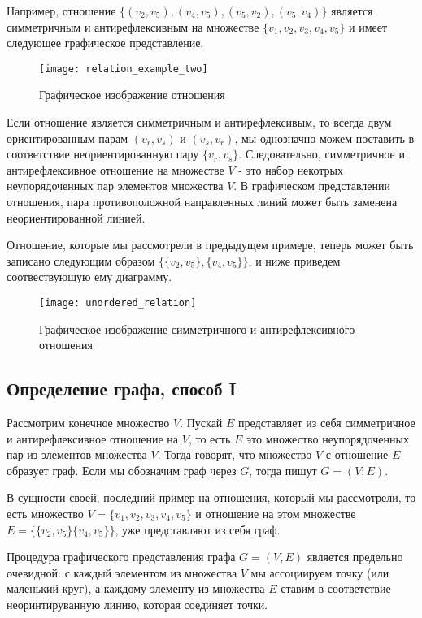 \documentclass{article}
\begin{document}
Например, отношение $\{ (v_2, v_5), (v_4, v_5), (v_5, v_2), (v_5, v_4) \}$ является симметричным и антирефлексивным на множестве $\{ v_1, v_2, v_3, v_4, v_5  \}$ и имеет следующее графическое представление.

\begin{figure}[h]
\texttt{[image: relation\_example\_two]}
\centering
\caption{Графическое изображение отношения}
\end{figure}

Если отношение является симметричным и антирефлексивым, то всегда двум ориентированным парам $(v_r, v_s)$ и $(v_s, v_r)$, мы однозначно можем поставить в соответствие неориентированную пару $\{v_r, v_s\}$. Следовательно, симметричное и антирефлексивное отношение на множестве $V$ - это набор некотрых неупорядоченных пар элементов множества $V$. В графическом представлении отношения, пара противоположной направленных линий может быть заменена неориентированной линией.

Отношение, которые мы рассмотрели в предыдущем примере, теперь может быть записано следующим образом $\{ \{v_2, v_5 \}, \{ v_4, v_5 \}  \}$, и ниже приведем соотвествующую ему диаграмму.

\begin{figure}[h]
\texttt{[image: unordered\_relation]}
\centering
\caption{Графическое изображение симметричного и антирефлексивного отношения}
\end{figure}

\subsection{Определение графа, способ I}

Рассмотрим конечное множество $V$. Пускай $E$ представляет из себя симметричное и антирефлексивное отношение на $V$, то есть $E$ это множество неупорядоченных пар из элементов множества $V$. Тогда говорят, что множество $V$ с отношение $E$ образует граф. Если мы обозначим граф через $G$, тогда пишут $G = (V; E)$.

В сущности своей, последний пример на отношения, который мы рассмотрели, то есть множество $V = \{ v_1, v_2, v_3, v_4, v_5 \} $ и отношение на этом множестве $E =\{ \{v_2, v_5  \} \{v_4, v_5 \} \}$, уже представляют из себя граф.  

Процедура графического представления графа $G=(V, E)$ является предельно очевидной: с каждый элементом из множества $V$ мы ассоциируем точку (или маленький круг), а каждому элементу из множества $E$ ставим в соответствие неоринтируванную линию, которая соединяет точки.
\end{document}
